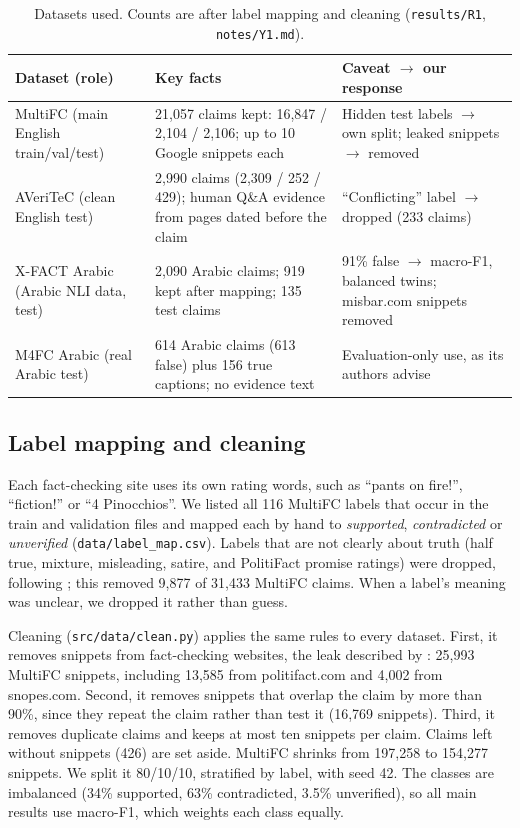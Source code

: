 \documentclass[11pt,a4paper]{article}
\begin{document}
\begin{table}[t]
\centering\small
\caption{Datasets used. Counts are after label mapping and cleaning (\texttt{results/R1}, \texttt{notes/Y1.md}).}
\label{tab:data}
\begin{tabularx}{\textwidth}{@{}l X X@{}}
\toprule
Dataset (role) & Key facts & Caveat $\rightarrow$ our response \\
\midrule
MultiFC (main English train/val/test) & 21,057 claims kept: 16,847 / 2,104 / 2,106; up to 10 Google snippets each & Hidden test labels $\rightarrow$ own split; leaked snippets $\rightarrow$ removed \\
AVeriTeC (clean English test) & 2,990 claims (2,309 / 252 / 429); human Q\&A evidence from pages dated before the claim & ``Conflicting'' label $\rightarrow$ dropped (233 claims) \\
X-FACT Arabic (Arabic NLI data, test) & 2,090 Arabic claims; 919 kept after mapping; 135 test claims & 91\% false $\rightarrow$ macro-F1, balanced twins; misbar.com snippets removed \\
M4FC Arabic (real Arabic test) & 614 Arabic claims (613 false) plus 156 true captions; no evidence text & Evaluation-only use, as its authors advise \\
\bottomrule
\end{tabularx}
\end{table}

\subsection{Label mapping and cleaning}
Each fact-checking site uses its own rating words, such as ``pants on fire!'', ``fiction!'' or ``4 Pinocchios''. We listed all 116 MultiFC labels that occur in the train and validation files and mapped each by hand to \emph{supported}, \emph{contradicted} or \emph{unverified} (\texttt{data/label\_map.csv}). Labels that are not clearly about truth (half true, mixture, misleading, satire, and PolitiFact promise ratings) were dropped, following \citet{hansen2021reason}; this removed 9,877 of 31,433 MultiFC claims. When a label's meaning was unclear, we dropped it rather than guess.

Cleaning (\texttt{src/data/clean.py}) applies the same rules to every dataset. First, it removes snippets from fact-checking websites, the leak described by \citet{glockner2022missing}: 25,993 MultiFC snippets, including 13,585 from politifact.com and 4,002 from snopes.com. Second, it removes snippets that overlap the claim by more than 90\%, since they repeat the claim rather than test it (16,769 snippets). Third, it removes duplicate claims and keeps at most ten snippets per claim. Claims left without snippets (426) are set aside. MultiFC shrinks from 197,258 to 154,277 snippets. We split it 80/10/10, stratified by label, with seed 42. The classes are imbalanced (34\% supported, 63\% contradicted, 3.5\% unverified), so all main results use macro-F1, which weights each class equally.
\end{document}
